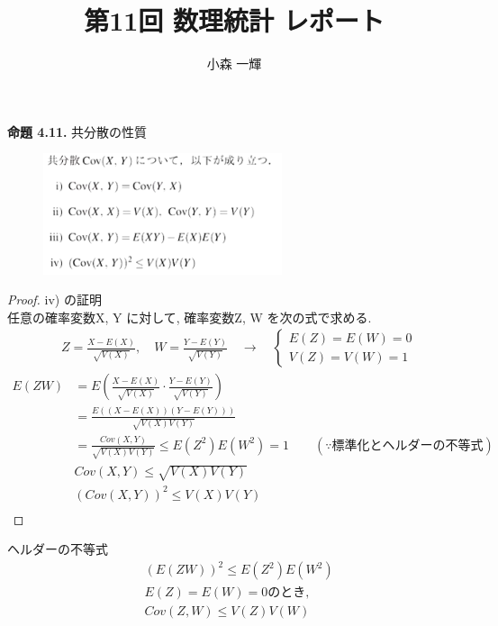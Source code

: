 \documentclass[dvipdfmx,10pt, a4j]{jarticle}
\title{第11回 数理統計 レポート}
\author{小森 一輝}
\theoremstyle{definition}
\begin{document}
\maketitle

\setcounter{section}{2}

\noindent
\textbf{命題 4.11.} 共分散の性質\\
\begin{figure}[htbp]
  \includegraphics[width=7.0cm]{D_11/meidai/4_11.png}
\end{figure}

\begin{proof}
    iv) の証明\\
    任意の確率変数X, Y に対して, 確率変数Z, W を次の式で求める.\\
    \begin{align*}
      &Z = \frac{X-E(X)}{\sqrt{V(X)}}, \quad W = \frac{Y-E(Y)}{\sqrt{V(Y)}} \quad \to \quad
      \begin{cases}
        E(Z) = E(W) = 0\\
        V(Z) = V(W) = 1  
      \end{cases}
    \end{align*}
    \begin{align*}
      E(ZW) &= E(\frac{X-E(X)}{\sqrt{V(X)}} \cdot \frac{Y-E(Y)}{\sqrt{V(Y)}})\\
      &= \frac{E((X-E(X))(Y-E(Y)))}{\sqrt{V(X)V(Y)}}\\
      &= \frac{Cov(X, Y)}{\sqrt{V(X)V(Y)}} \leq E(Z^2)E(W^2) = 1 \qquad (\because 標準化とヘルダーの不等式)\\
      &Cov(X, Y) \leq \sqrt{V(X)V(Y)}\\
      &(Cov(X, Y))^2 \leq V(X)V(Y)\\
    \end{align*}
\end{proof}

\begin{itembox}[l]{ヘルダーの不等式}
  \begin{align*}
    &(E(ZW))^2 \leq E(Z^2)E(W^2)\\
    &E(Z) = E(W) = 0のとき,\\
    &Cov(Z, W) \leq V(Z)V(W)\\
  \end{align*}
\end{itembox}\\
\end{document}
